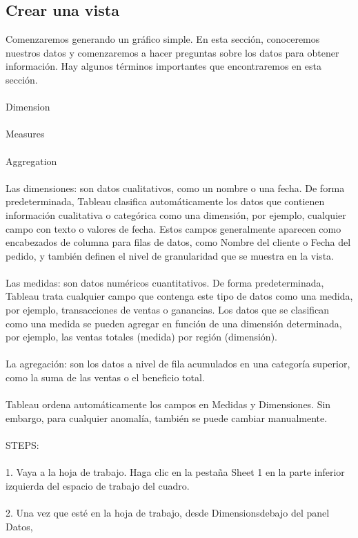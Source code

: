 \documentclass[12pt,letterpaper]{article}
\begin{document}
\subsection{Crear una vista}
Comenzaremos generando un gráfico simple. En esta sección, conoceremos nuestros datos y
comenzaremos a hacer preguntas sobre los datos para obtener información. Hay algunos términos
importantes que encontraremos en esta sección.
\\\\Dimension
\\\\Measures
\\\\Aggregation
\\\\Las dimensiones: son datos cualitativos, como un nombre o una fecha. De forma predeterminada,
Tableau clasifica automáticamente los datos que contienen información cualitativa o categórica como
una dimensión, por ejemplo, cualquier campo con texto o valores de fecha. Estos campos generalmente
aparecen como encabezados de columna para filas de datos, como Nombre del cliente o Fecha del
pedido, y también definen el nivel de granularidad que se muestra en la vista.
\\\\Las medidas: son datos numéricos cuantitativos. De forma predeterminada, Tableau trata cualquier
campo que contenga este tipo de datos como una medida, por ejemplo, transacciones de ventas o
ganancias. Los datos que se clasifican como una medida se pueden agregar en función de una
dimensión determinada, por ejemplo, las ventas totales (medida) por región (dimensión).
\\\\La agregación: son los datos a nivel de fila acumulados en una categoría superior, como la suma de las
ventas o el beneficio total.
\\\\Tableau ordena automáticamente los campos en Medidas y Dimensiones. Sin embargo, para cualquier
anomalía, también se puede cambiar manualmente.
\\\\STEPS:
\\\\1. Vaya a la hoja de trabajo. Haga clic en la pestaña Sheet 1 en la parte inferior izquierda del
espacio de trabajo del cuadro.
\\\\2. Una vez que esté en la hoja de trabajo, desde Dimensionsdebajo del panel Datos,
\end{document}
